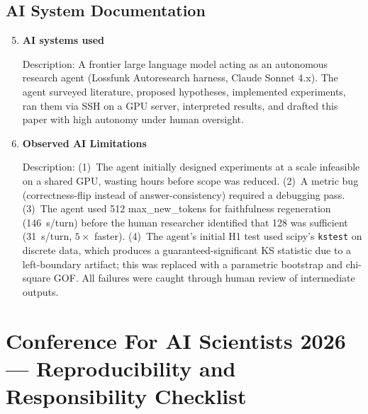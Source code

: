 \documentclass{article}
\begin{document}
\subsection*{AI System Documentation}

\begin{enumerate}
  \setcounter{enumi}{4}

  \item \textbf{AI systems used}

  Description: A frontier large language model acting as an
  autonomous research agent (Lossfunk Autoresearch harness,
  Claude Sonnet 4.x).
  The agent surveyed literature, proposed hypotheses, implemented
  experiments, ran them via SSH on a GPU server, interpreted
  results, and drafted this paper with high autonomy under human
  oversight.

  \item \textbf{Observed AI Limitations}

  Description:
  (1)~The agent initially designed experiments at a scale
  infeasible on a shared GPU, wasting hours before scope was
  reduced.
  (2)~A metric bug (correctness-flip instead of answer-consistency)
  required a debugging pass.
  (3)~The agent used 512 max\_new\_tokens for faithfulness
  regeneration (146~s/turn) before the human researcher identified
  that 128 was sufficient (31~s/turn, $5\times$ faster).
  (4)~The agent's initial H1 test used scipy's \texttt{kstest}
  on discrete data, which produces a guaranteed-significant KS
  statistic due to a left-boundary artifact; this was replaced
  with a parametric bootstrap and chi-square GOF.
  All failures were caught through human review of
  intermediate outputs.

\end{enumerate}

\newpage

\section*{Conference For AI Scientists 2026 --- Reproducibility and Responsibility Checklist}
\label{checklist_reproducibility}
\end{document}

